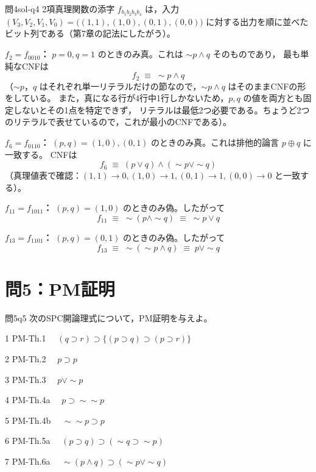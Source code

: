 \documentclass[autodetect-engine,dvi=dvipdfmx,ja=standard]{bxjsarticle}
\begin{document}
\begin{solution}{問4}{sol-q4}
2項真理関数の添字 \(f_{b_1b_2b_3b_4}\) は，入力 \((V_3,V_2,V_1,V_0)=\bigl((1,1),(1,0),(0,1),(0,0)\bigr)\)
に対する出力を順に並べたビット列である（第7章の記法にしたがう）。

\textbf{\(f_2=f_{0010}\)：} \(p=0,q=1\) のときのみ真。これは \(\sim p\land q\) そのものであり，
最も単純なCNFは
\[
  f_2 \;\equiv\; \sim p\land q
\]
（\(\sim p\)，\(q\) はそれぞれ単一リテラルだけの節なので，\(\sim p\land q\) はそのままCNFの形をしている。
また，真になる行が4行中1行しかないため，\(p,q\) の値を両方とも固定しないとその1点を特定できず，
リテラルは最低2つ必要である。ちょうど2つのリテラルで表せているので，これが最小のCNFである）。

\textbf{\(f_6=f_{0110}\)：} \((p,q)=(1,0),(0,1)\) のときのみ真。これは排他的論言 \(p\oplus q\) に一致する。
CNFは
\[
  f_6 \;\equiv\; (p\lor q)\land(\sim p\lor\sim q)
\]
（真理値表で確認：\((1,1)\to0,(1,0)\to1,(0,1)\to1,(0,0)\to0\) と一致する）。

\textbf{\(f_{11}=f_{1011}\)：} \((p,q)=(1,0)\) のときのみ偽。したがって
\[
  f_{11}\;\equiv\;\sim(p\land\sim q)\;\equiv\;\sim p\lor q
\]

\textbf{\(f_{13}=f_{1101}\)：} \((p,q)=(0,1)\) のときのみ偽。したがって
\[
  f_{13}\;\equiv\;\sim(\sim p\land q)\;\equiv\;p\lor\sim q
\]
\end{solution}

\section{問5：PM証明}

\begin{exercise}{問5}{q5}
次のSPC開論理式について，PM証明を与えよ。
\begin{pstep}{1}
  PM-Th.1 \(\quad(q\supset r)\supset\{(p\supset q)\supset(p\supset r)\}\)
\end{pstep}
\begin{pstep}{2}
  PM-Th.2 \(\quad p\supset p\)
\end{pstep}
\begin{pstep}{3}
  PM-Th.3 \(\quad p\lor\sim p\)
\end{pstep}
\begin{pstep}{4}
  PM-Th.4a \(\quad p\supset\sim\sim p\)
\end{pstep}
\begin{pstep}{5}
  PM-Th.4b \(\quad\sim\sim p\supset p\)
\end{pstep}
\begin{pstep}{6}
  PM-Th.5a \(\quad(p\supset q)\supset(\sim q\supset\sim p)\)
\end{pstep}
\begin{pstep}{7}
  PM-Th.6a \(\quad\sim(p\land q)\supset(\sim p\lor\sim q)\)
\end{pstep}
\end{exercise}
\end{document}
